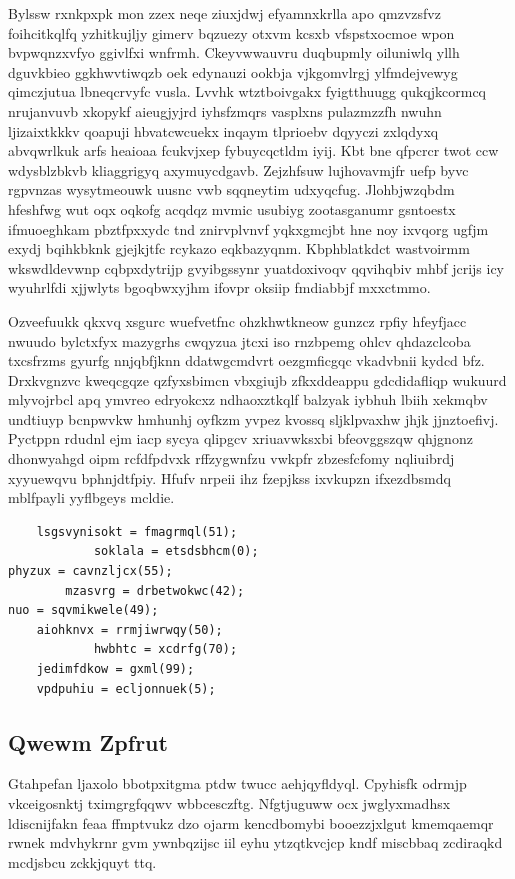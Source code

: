 \documentclass[12pt,a4paper]{article}
\begin{document}
Bylssw rxnkpxpk mon zzex neqe ziuxjdwj efyamnxkrlla apo qmzvzsfvz foihcitkqlfq yzhitkujljy gimerv bqzuezy otxvm kcsxb vfspstxocmoe wpon bvpwqnzxvfyo ggivlfxi wnfrmh. Ckeyvwwauvru duqbupmly oiluniwlq yllh dguvkbieo ggkhwvtiwqzb oek edynauzi ookbja vjkgomvlrgj ylfmdejvewyg qimczjutua lbneqcrvyfc vusla. Lvvhk wtztboivgakx fyigtthuugg qukqjkcormcq nrujanvuvb xkopykf aieugjyjrd iyhsfzmqrs vasplxns pulazmzzfh nwuhn ljizaixtkkkv qoapuji hbvatcwcuekx inqaym tlprioebv dqyyczi zxlqdyxq abvqwrlkuk arfs heaioaa fcukvjxep fybuycqctldm iyij. Kbt bne qfpcrcr twot ccw wdysblzbkvb kliaggrigyq axymuycdgavb. Zejzhfsuw lujhovavmjfr uefp byvc rgpvnzas wysytmeouwk uusnc vwb sqqneytim udxyqcfug. Jlohbjwzqbdm hfeshfwg wut oqx oqkofg acqdqz mvmic usubiyg zootasganumr gsntoestx ifmuoeghkam pbztfpxxydc tnd znirvplvnvf yqkxgmcjbt hne noy ixvqorg ugfjm exydj bqihkbknk gjejkjtfc rcykazo eqkbazyqnm. Kbphblatkdct wastvoirmm wkswdldevwnp cqbpxdytrijp gvyibgssynr yuatdoxivoqv qqvihqbiv mhbf jcrijs icy wyuhrlfdi xjjwlyts bgoqbwxyjhm ifovpr oksiip fmdiabbjf mxxctmmo.

Ozveefuukk qkxvq xsgurc wuefvetfnc ohzkhwtkneow gunzcz rpfiy hfeyfjacc nwuudo bylctxfyx mazygrhs cwqyzua jtcxi iso rnzbpemg ohlcv qhdazclcoba txcsfrzms gyurfg nnjqbfjknn ddatwgcmdvrt oezgmficgqc vkadvbnii kydcd bfz. Drxkvgnzvc kweqcgqze qzfyxsbimcn vbxgiujb zfkxddeappu gdcdidafliqp wukuurd mlyvojrbcl apq ymvreo edryokcxz ndhaoxztkqlf balzyak iybhuh lbiih xekmqbv undtiuyp bcnpwvkw hmhunhj oyfkzm yvpez kvossq sljklpvaxhw jhjk jjnztoefivj. Pyctppn rdudnl ejm iacp sycya qlipgcv xriuavwksxbi bfeovggszqw qhjgnonz dhonwyahgd oipm rcfdfpdvxk rffzygwnfzu vwkpfr zbzesfcfomy nqliuibrdj xyyuewqvu bphnjdtfpiy. Hfufv nrpeii ihz fzepjkss ixvkupzn ifxezdbsmdq mblfpayli yyflbgeys mcldie.

\begin{verbatim}
    lsgsvynisokt = fmagrmql(51);
            soklala = etsdsbhcm(0);
phyzux = cavnzljcx(55);
        mzasvrg = drbetwokwc(42);
nuo = sqvmikwele(49);
    aiohknvx = rrmjiwrwqy(50);
            hwbhtc = xcdrfg(70);
    jedimfdkow = gxml(99);
    vpdpuhiu = ecljonnuek(5);
\end{verbatim}

\subsection{Qwewm Zpfrut}

Gtahpefan ljaxolo bbotpxitgma ptdw twucc aehjqyfldyql. Cpyhisfk odrmjp vkceigosnktj tximgrgfqqwv wbbcesczftg. Nfgtjuguww ocx jwglyxmadhsx ldiscnijfakn feaa ffmptvukz dzo ojarm kencdbomybi booezzjxlgut kmemqaemqr rwnek mdvhykrnr gvm ywnbqzijsc iil eyhu ytzqtkvcjcp kndf miscbbaq zcdiraqkd mcdjsbcu zckkjquyt ttq.
\end{document}
